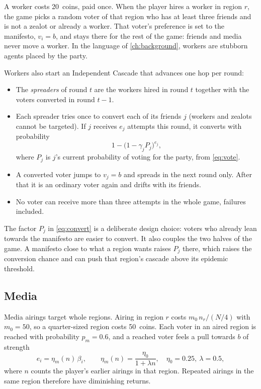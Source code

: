 \documentclass[11pt,a4paper,oneside]{report}
\newcommand{\coins}[1]{#1~coins}
\begin{document}
A worker costs \coins{20}, paid once. When the player hires a worker in region $r$, the game picks a random
voter of that region who has at least three friends and is not a zealot or already a worker. That voter's
preference is set to the manifesto, $v_i = b$, and stays there for the rest of the game: friends and media
never move a worker. In the language of \cref{ch:background}, workers are stubborn agents placed by the
party.

Workers also start an Independent Cascade that advances one hop per round:
\begin{itemize}
  \item The \emph{spreaders} of round $t$ are the workers hired in round $t$ together with the voters
        converted in round $t-1$.
  \item Each spreader tries once to convert each of its friends $j$ (workers and zealots cannot be
        targeted). If $j$ receives $e_j$ attempts this round, it converts with probability
        \begin{equation}\label{eq:convert}
          1 - \bigl(1 - \gamma_j P_j\bigr)^{e_j},
        \end{equation}
        where $P_j$ is $j$'s current probability of voting for the party, from \cref{eq:vote}.
  \item A converted voter jumps to $v_j = b$ and spreads in the next round only. After that it is an
        ordinary voter again and drifts with its friends.
  \item No voter can receive more than three attempts in the whole game, failures included.
\end{itemize}
The factor $P_j$ in \cref{eq:convert} is a deliberate design choice: voters who already lean towards the
manifesto are easier to convert. It also couples the two halves of the game. A manifesto close to what a
region wants raises $P_j$ there, which raises the conversion chance and can push that region's cascade
above its epidemic threshold.

\subsection{Media}

Media airings target whole regions. Airing in region $r$ costs $m_0\, n_r / (N/4)$ with $m_0 = 50$, so a
quarter-sized region costs \coins{50}. Each voter in an aired region is reached with probability
$p_m = 0.6$, and a reached voter feels a pull towards $b$ of strength
\begin{equation}
  e_i = \eta_m(n)\,\beta_i, \qquad \eta_m(n) = \frac{\eta_0}{1+\lambda n},\quad \eta_0 = 0.25,\ \lambda = 0.5,
\end{equation}
where $n$ counts the player's earlier airings in that region. Repeated airings in the same region therefore
have diminishing returns.
\end{document}
